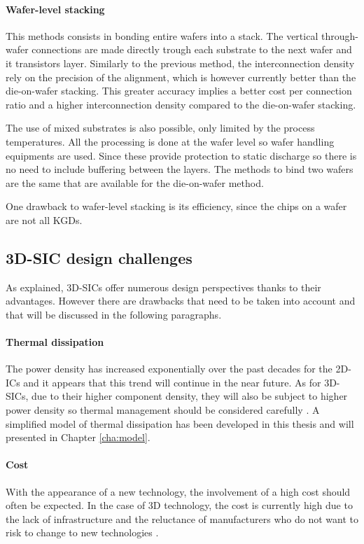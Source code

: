 \paragraph{Wafer-level stacking}

This methods consists in bonding entire wafers into a stack. The vertical through-wafer connections are made directly trough each substrate to the next wafer and it transistors layer. Similarly to the previous method, the interconnection density rely on the precision of the alignment, which is however currently better than the die-on-wafer stacking. This greater accuracy implies a better cost per connection ratio and a higher interconnection density compared to the die-on-wafer stacking.

The use of mixed substrates is also possible, only limited by the process temperatures. All the processing is done at the wafer level so wafer handling equipments are used. Since these provide protection to static discharge so there is no need to include buffering between the layers. The methods to bind two wafers are the same that are available for the die-on-wafer method.

One drawback to wafer-level stacking is its efficiency, since the chips on a wafer are not all KGDs.

\subsection{3D-SIC design challenges}

As explained, 3D-SICs offer numerous design perspectives thanks to their advantages. However there are drawbacks that need to be taken into account and that will be discussed in the following paragraphs.

\paragraph{Thermal dissipation}
The power density has increased exponentially over the past decades for the 2D-ICs and it appears that this trend will continue in the near future. As for 3D-SICs, due to their higher component density, they will also be subject to higher power density so thermal management should be considered carefully \cite{659500}. A simplified model of thermal dissipation has been developed in this thesis and will presented in Chapter \ref{cha:model}.

\paragraph{Cost}
With the appearance of a new technology, the involvement of a high cost should often be expected. In the case of 3D technology, the cost is currently high due to the lack of infrastructure and the reluctance of manufacturers who do not want to risk to change to new technologies \cite{659500}.

